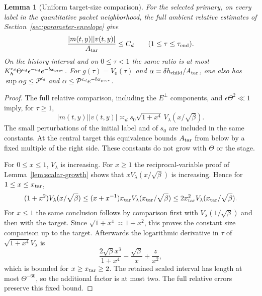 \documentclass[11pt]{article}
\newtheorem{lemma}[theorem]{Lemma}
\theoremstyle{definition}
\begin{document}
\begin{lemma}[Uniform target-size comparison]\label{lem:uniform-packet-size}
For the selected primary, on every label in the quantitative packet
neighborhood, the full ambient relative estimates of
Section~\ref{sec:parameter-envelope} give
\[
 \frac{|m(t,y)||v(t,y)|}{A_{\rm tar}}\leq C_d
       \qquad(1\leq\tau\leq\tau_{\rm end}).
\]
On the history interval and on $0\leq\tau<1$ the same ratio is at most
$K_h^{c_d}\Theta^{c_d}\epsilon^{-c_d}e^{-b x_{\rm prev}}$.
For $g(\tau)=V_0(\tau)$ and
$\alpha=\delta h_{\rm child}/A_{\rm tar}$, one also has
$\sup\alpha g\leq\mathcal P^{c_d}$ and
$\alpha\leq\mathcal P^{c_d}e^{-b x_{\rm prev}}$.
\end{lemma}
\begin{proof}
The full relative comparison, including the $E^\perp$ components, and
$\epsilon\Theta^2\ll1$ imply, for $\tau\geq1$,
\[
 |m(t,y)||v(t,y)|\asymp_d
       s_0\sqrt{1+x^4}\,V_\lambda(x/\sqrt\beta).
\]
The small perturbations of the initial label and of $s_0$ are included
in the same constants. At the central target this equivalence bounds
$A_{\rm tar}$ from below by a fixed multiple of the right side.
These constants do not grow with $\Theta$ or the stage.

For $0\leq x\leq1$, $V_\lambda$ is increasing. For $x\geq1$ the
reciprocal-variable proof of Lemma~\ref{lem:scalar-growth} shows that
$xV_\lambda(x/\sqrt\beta)$ is increasing. Hence for
$1\leq x\leq x_{\rm tar}$,
\[
 (1+x^2)V_\lambda(x/\sqrt\beta)
 \leq (x+x^{-1})x_{\rm tar}
             V_\lambda(x_{\rm tar}/\sqrt\beta)
 \leq2x_{\rm tar}^2V_\lambda(x_{\rm tar}/\sqrt\beta).
\]
For $x\leq1$ the same conclusion follows by comparison first with
$V_\lambda(1/\sqrt\beta)$ and then with the target. Since
$\sqrt{1+x^4}\asymp1+x^2$, this proves the constant size comparison
up to the target. Afterwards the logarithmic derivative in $\tau$ of
$\sqrt{1+x^4}V_\lambda$ is
\[
 \frac{2\sqrt\beta x^3}{1+x^4}-\frac{\sqrt\beta}{x}
                                          +\frac z{x^2},
\]
which is bounded for $x\geq x_{\rm tar}\geq2$. The retained scaled
interval has length at most $\Theta^{-60}$, so the additional factor is at
most two. The full relative errors preserve this fixed bound.


\end{proof}
\end{document}
